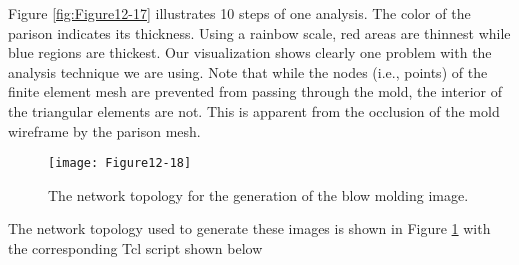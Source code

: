 Figure \ref{fig:Figure12-17} illustrates 10 steps of one analysis. The color of the parison indicates its thickness. Using a rainbow scale, red areas are thinnest while blue regions are thickest. Our visualization shows
clearly one problem with the analysis technique we are using. Note that while the nodes (i.e., points) of the finite element mesh are prevented from passing through the mold, the interior of the triangular elements are not. This is apparent from the occlusion of the mold wireframe by the parison mesh.

\begin{figure}[!htb]
	\centering
	\texttt{[image: Figure12-18]}
	\caption{The network topology for the generation of the blow molding image.}
	\label{fig:Figure12-18}
\end{figure}

The network topology used to generate these images is shown in Figure \ref{fig:Figure12-18} with the corresponding Tcl script shown below

